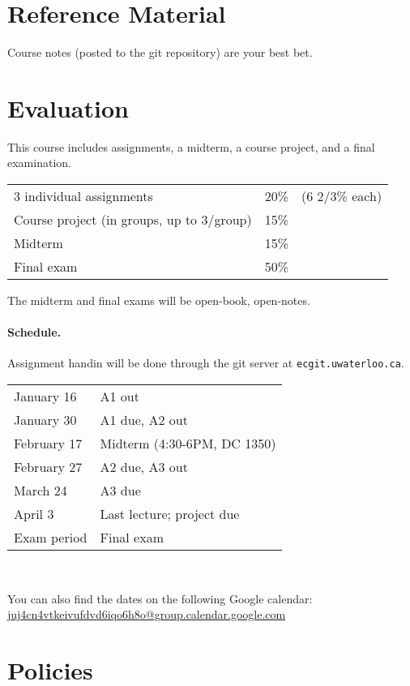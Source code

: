 \documentclass{article}
\begin{document}
\section*{Reference Material}
Course notes (posted to the git repository) are your best bet.

\newpage
\section*{Evaluation}
This course includes assignments, a midterm, a course project, and a final
examination.

\begin{tabular}{lrl}
3 individual assignments & 20\% & (6 2/3\% each) \\
Course project (in groups, up to 3/group) & 15\% \\
Midterm & 15\% \\
Final exam & 50\% \\
\end{tabular}

\noindent The midterm and final exams will be open-book, open-notes. 

\paragraph{Schedule.} Assignment handin will be done through the git server at {\tt ecgit.uwaterloo.ca}.\\[-1em]
\begin{center}
\begin{tabular}{ll}
January 16	&A1 out\\
January 30	&A1 due, A2 out\\
February 17 &Midterm (4:30-6PM, DC 1350)\\
February 27	&A2 due, A3 out\\
March 24	&A3 due\\
April 3 	&Last lecture; project due\\
Exam period	&Final exam
\end{tabular}~\\
\end{center}
You can also find the dates on the following Google calendar:\\
\hspace*{3em}\url{juj4cn4vtkeivufdvd6iqo6h8o@group.calendar.google.com}

\section*{Policies}
\end{document}
